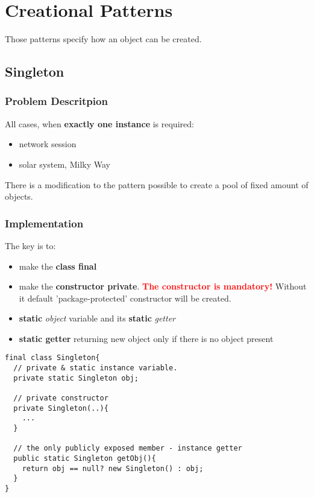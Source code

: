 \documentclass{report}
\begin{document}
\part{Creational Patterns}

Those patterns specify how an object can be created.


\chapter{Singleton}

\section{Problem Descritpion}
All cases, when \textbf{exactly one instance} is required:
\begin{itemize}
	\item network session
	\item solar system, Milky Way
\end{itemize}
There is a modification to the pattern possible to create a pool of fixed amount of objects.

\section{Implementation}
The key is to:
\begin{itemize}
	\item make the \textbf{class final}
	\item make the \textbf{constructor private}. \textbf{\textcolor{red}{The constructor is mandatory!}} Without it default 'package-protected'
	constructor will be created.
	\item \textbf{static} \textit{object} variable and its \textbf{static} \textit{getter}
	\item \textbf{static getter} returning new object only if there is no object present
\end{itemize}

\begin{verbatim}
final class Singleton{
  // private & static instance variable.
  private static Singleton obj;

  // private constructor
  private Singleton(..){
    ...
  }

  // the only publicly exposed member - instance getter
  public static Singleton getObj(){
    return obj == null? new Singleton() : obj;
  }
}
\end{verbatim}
\end{document}

